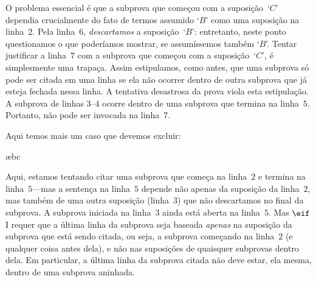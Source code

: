 O problema essencial é que a subprova que começou com a suposição~`$C$' dependia crucialmente do fato de termos assumido `$B$' como uma suposição na linha~$2$.  Pela linha~$6$, \emph{descartamos} a suposição~`$B$': entretanto,  neste ponto questionamos  o que poderíamos mostrar, se assumíssemos também `$B$'. Tentar justificar a linha~$7$ com a subprova que começou com a suposição~`$C$', é simplesmente uma trapaça.  Assim estipulamos, como antes, que uma subprova só pode ser citada em uma linha se ela não ocorrer dentro de outra subprova que já esteja fechada nessa linha. A tentativa desastrosa da prova viola esta estipulação.  A subprova de linhas $3$--$4$ ocorre dentro de uma subprova que termina na linha~$5$. Portanto, não pode ser invocada na linha~$7$.


Aqui temos mais um caso que devemos excluir:
\begin{fitchproof}
\open
	\open
	\ae{bc}
	\close
\close
{}
 
\end{fitchproof}
Aqui, estamos tentando citar uma subprova que começa na linha~$2$ e termina na linha~$5$---mas a sentença na linha~$5$ depende não apenas da suposição da linha~$2$, mas também de uma outra suposição (linha~$3$) que não descartamos no final da subprova.  A subprova iniciada na linha~$3$ ainda está aberta na linha~$5$.  Mas $\eif$I requer que a última linha da subprova seja baseada \emph{apenas} na suposição da subprova  que está sendo citada, ou seja, a subprova começando na linha~$2$ (e qualquer coisa antes dela), e não nas suposições de quaisquer subprovas dentro dela. Em particular, a última linha da subprova citada não deve estar, ela mesma, dentro de uma subprova
aninhada.



